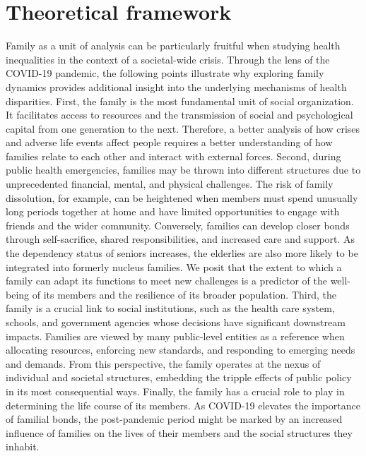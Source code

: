 \documentclass[
]{article}
\begin{document}
\newpage

\hypertarget{theoretical-framework-1}{%
\section{Theoretical framework}\label{theoretical-framework-1}}

Family as a unit of analysis can be particularly fruitful when studying health
inequalities in the context of a societal-wide crisis. Through the lens of the
COVID-19 pandemic, the following points illustrate why exploring family dynamics
provides additional insight into the underlying mechanisms of health
disparities. First, the family is the most fundamental unit of social
organization. It facilitates access to resources and the transmission of social
and psychological capital from one generation to the next. Therefore, a better
analysis of how crises and adverse life events affect people requires a better
understanding of how families relate to each other and interact with external
forces. Second, during public health emergencies, families may be thrown into
different structures due to unprecedented financial, mental, and physical
challenges. The risk of family dissolution, for example, can be heightened when
members must spend unusually long periods together at home and have limited
opportunities to engage with friends and the wider community. Conversely,
families can develop closer bonds through self-sacrifice, shared
responsibilities, and increased care and support. As the dependency status of
seniors increases, the elderlies are also more likely to be integrated into
formerly nucleus families. We posit that the extent to which a family can adapt
its functions to meet new challenges is a predictor of the well-being of its
members and the resilience of its broader population. Third, the family is a
crucial link to social institutions, such as the health care system, schools,
and government agencies whose decisions have significant downstream impacts.
Families are viewed by many public-level entities as a reference when allocating
resources, enforcing new standards, and responding to emerging needs and
demands. From this perspective, the family operates at the nexus of individual
and societal structures, embedding the tripple effects of public policy in its
most consequential ways. Finally, the family has a crucial role to play in
determining the life course of its members. As COVID-19 elevates the importance
of familial bonds, the post-pandemic period might be marked by an increased
influence of families on the lives of their members and the social structures
they inhabit.
\end{document}
